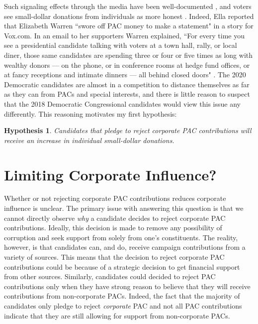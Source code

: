 \documentclass[12pt]{article}
\newtheorem{hyp}{Hypothesis}
\begin{document}
 Such signaling effects through the media have been well-documented \citep{iyengar1989}, and voters see small-dollar donations from individuals as more honest \citep{bowler2016}. Indeed, Ella \citet{nilsen2019} reported that Elizabeth Warren ``swore off PAC money to make a statement" in a story for Vox.com. In an email to her supporters Warren explained, ``For every time you see a presidential candidate talking with voters at a town hall, rally, or local diner, those same candidates are spending three or four or five times as long with wealthy donors — on the phone, or in conference rooms at hedge fund offices, or at fancy receptions and intimate dinners — all behind closed doors" \citep{nilsen2019}. The 2020 Democratic candidates are almost in a competition to distance themselves as far as they can from PACs and special interests, and there is little reason to suspect that the 2018 Democratic Congressional candidates would view this issue any differently. This reasoning motivates my first hypothesis:  
 
 \begin{hyp}
     Candidates that pledge to reject corporate PAC contributions will receive an increase in individual small-dollar donations. 
 \end{hyp}



\section{Limiting Corporate Influence?}

Whether or not rejecting corporate PAC contributions reduces corporate influence is unclear. The primary issue with answering this question is that we cannot directly observe \emph{why} a candidate decides to reject corporate PAC contributions. Ideally, this decision is made to remove any possibility of corruption and seek support from solely from one's constituents. The reality, however, is that candidates can, and do, receive campaign contributions from a variety of sources. This means that the decision to reject corporate PAC contributions could be because of a strategic decision to get financial support from other sources. Similarly, candidates could decided to reject PAC contributions only when they have strong reason to believe that they will receive contributions from non-corporate PACs. Indeed, the fact that the majority of candidates only pledge to reject \emph{corporate} PAC and not all PAC contributions indicate that they are still allowing for support from non-corporate PACs.
 
\end{document}
